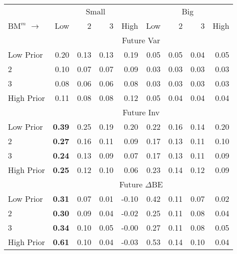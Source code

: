 
\begin{tabular}{lrrrrrrrr}
  \toprule
     & \multicolumn{4}{c}{Small} & \multicolumn{4}{c}{Big}  \\
     \cmidrule(r){2-5} \cmidrule(r){6-9}
    $\text{BM}^m$ $\rightarrow$ & Low & 2 & 3 & High & Low & 2 & 3 & High  \\ 
  \midrule
  
  
    
  
    & \multicolumn{8}{c}{Future Var}  \\
     \cmidrule(r){2-5} \cmidrule(r){6-9}
    Low Prior  & 0.20  & 0.13  & 0.13  & 0.19  & 0.05  & 0.05  & 0.04  & 0.05   \\
    2  & 0.10  & 0.07  & 0.07  & 0.09  & 0.03  & 0.03  & 0.03  & 0.03   \\
    3  & 0.08  & 0.06  & 0.06  & 0.08  & 0.03  & 0.03  & 0.03  & 0.03   \\
    High Prior  & 0.11  & 0.08  & 0.08  & 0.12  & 0.05  & 0.04  & 0.04  & 0.04   \\
    
  
    & \multicolumn{8}{c}{Future Inv}  \\
     \cmidrule(r){2-5} \cmidrule(r){6-9}
    Low Prior  & \textbf{0.39}  & 0.25  & 0.19  & 0.20  & 0.22  & 0.16  & 0.14  & 0.20   \\
    2  & \textbf{0.27}  & 0.16  & 0.11  & 0.09  & 0.17  & 0.13  & 0.11  & 0.10   \\
    3  & \textbf{0.24}  & 0.13  & 0.09  & 0.07  & 0.17  & 0.13  & 0.11  & 0.09   \\
    High Prior  & \textbf{0.25}  & 0.12  & 0.10  & 0.06  & 0.23  & 0.14  & 0.12  & 0.09   \\
    
  
    & \multicolumn{8}{c}{Future $\Delta\text{BE}$}  \\
     \cmidrule(r){2-5} \cmidrule(r){6-9}
    Low Prior  & \textbf{0.31}  & 0.07  & 0.01  & -0.10  & 0.42  & 0.11  & 0.07  & 0.02   \\
    2  & \textbf{0.30}  & 0.09  & 0.04  & -0.02  & 0.25  & 0.11  & 0.08  & 0.04   \\
    3  & \textbf{0.34}  & 0.10  & 0.05  & -0.00  & 0.27  & 0.11  & 0.08  & 0.05   \\
    High Prior  & \textbf{0.61}  & 0.10  & 0.04  & -0.03  & 0.53  & 0.14  & 0.10  & 0.04   \\
    
  
  \bottomrule
\end{tabular}
